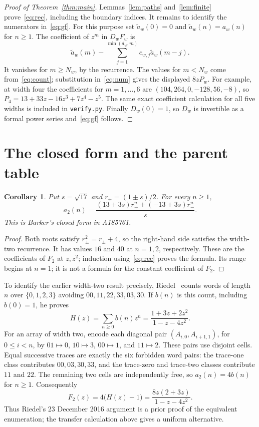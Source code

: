 \documentclass[11pt]{article}
\newtheorem{corollary}[theorem]{Corollary}
\begin{document}
\begin{proof}[Proof of Theorem~\ref{thm:main}]
Lemmas~\ref{lem:paths} and~\ref{lem:finite} prove~\eqref{eq:rec}, including
the boundary indices. It remains to identify the numerators in~\eqref{eq:gf}.
For this purpose set $\widetilde a_w(0)=0$ and
$\widetilde a_w(n)=a_w(n)$ for $n\ge1$. The coefficient of $z^m$ in
$D_wF_w$ is
\begin{equation}\label{eq:num}
 \widetilde a_w(m)-\sum_{j=1}^{\min(d_w,m)}
 c_{w,j}\widetilde a_w(m-j).
\end{equation}
It vanishes for $m\ge N_w$, by the recurrence. The values for $m<N_w$
come from~\eqref{eq:count}; substitution in~\eqref{eq:num} gives the
displayed $8zP_w$. For example, at width four the coefficients for
$m=1,\ldots,6$ are $(104,264,0,-128,56,-8)$, so
$P_4=13+33z-16z^3+7z^4-z^5$.
The same exact coefficient calculation for all five widths is included
in \texttt{verify.py}. Finally $D_w(0)=1$, so $D_w$ is invertible as a
formal power series and~\eqref{eq:gf} follows.
\end{proof}

\section{The closed form and the parent table}
\begin{corollary}\label{cor:closed}
Put $s=\sqrt{17}$ and $r_\pm=(1\pm s)/2$. For every $n\ge1$,
\begin{equation}\label{eq:closed}
 a_2(n)=\frac{(13+3s)r_+^n+(-13+3s)r_-^n}{s}.
\end{equation}
This is Barker's closed form in A185761.
\end{corollary}
\begin{proof}
Both roots satisfy $r_\pm^2=r_\pm+4$, so the right-hand side satisfies
the width-two recurrence. It has values $16$ and $40$ at $n=1,2$,
respectively. These are the coefficients of $F_2$ at $z,z^2$; induction
using~\eqref{eq:rec} proves the formula. Its range begins at $n=1$;
it is not a formula for the constant coefficient of $F_2$.
\end{proof}

To identify the earlier width-two result precisely, Riedel~\cite{riedel}
counts words of length $n$ over $\{0,1,2,3\}$ avoiding
$00,11,22,33,03,30$. If $b(n)$ is this count, including $b(0)=1$, he proves
\[
 H(z)=\sum_{n\ge0}b(n)z^n=\frac{1+3z+2z^2}{1-z-4z^2}.
\]
For an array of width two, encode each diagonal pair
$(A_{i,0},A_{i+1,1})$, for $0\le i<n$, by
$01\mapsto0$, $10\mapsto3$, $00\mapsto1$, and $11\mapsto2$.
These pairs use disjoint cells. Equal successive traces are exactly the
six forbidden word pairs: the trace-one class contributes
$00,03,30,33$, and the trace-zero and trace-two classes contribute
$11$ and $22$. The remaining two cells are independently free, so
$a_2(n)=4b(n)$ for $n\ge1$. Consequently
\[
 F_2(z)=4\bigl(H(z)-1\bigr)=\frac{8z(2+3z)}{1-z-4z^2}.
\]
Thus Riedel's 23 December 2016 argument is a prior proof of the equivalent
enumeration; the transfer calculation above gives a uniform alternative.
\end{document}
